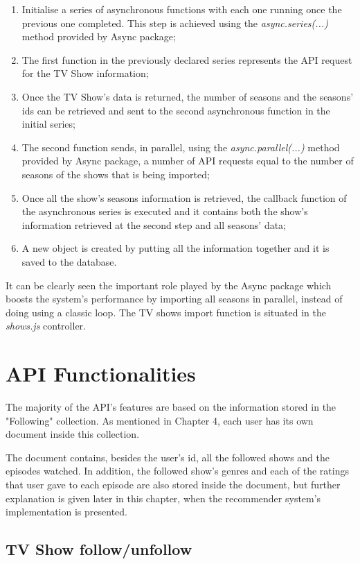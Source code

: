 \begin{enumerate}
    \item Initialise a series of asynchronous functions with each one running once the previous one completed. This step is achieved using the \textit{async.series(...)} method provided by Async package;
    \item The first function in the previously declared series represents the API request for the TV Show information;
    \item Once the TV Show's data is returned, the number of seasons and the seasons' ids can be retrieved and sent to the second asynchronous function in the initial series;
    \item The second function sends, in parallel, using the \textit{async.parallel(...)} method provided by Async package, a number of API requests equal to the number of seasons of the shows that is being imported;
    \item Once all the show's seasons information is retrieved, the callback function of the asynchronous series is executed and it contains both the show's information retrieved at the second step and all seasons' data;
    \item A new object is created by putting all the information together and it is saved to the database.
\end{enumerate}

It can be clearly seen the important role played by the Async package which boosts the system's performance by importing all seasons in parallel, instead of doing using a classic loop. The TV shows import function is situated in the \textit{shows.js} controller.

\section{API Functionalities}

The majority of the API's features are based on the information stored in the "Following" collection. As mentioned in Chapter 4, each user has its own document inside this collection.

The document contains, besides the user's id, all the followed shows and the episodes watched. In addition, the followed show's genres and each of the ratings that user gave to each episode are also stored inside the document, but further explanation is given later in this chapter, when the recommender system's implementation is presented.

\subsection{TV Show follow/unfollow}

